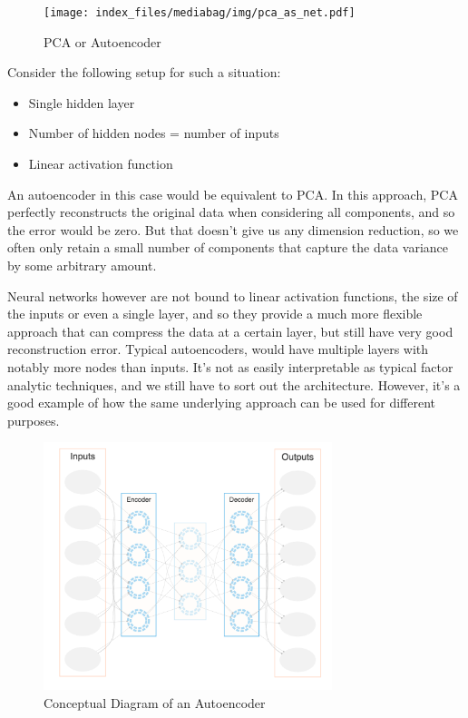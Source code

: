 \documentclass[
  letterpaper,
]{krantz}
\providecommand{\tightlist}{%
  \setlength{\itemsep}{0pt}\setlength{\parskip}{0pt}}\usepackage{longtable,booktabs,array}
\begin{document}
\begin{figure}

{\centering \texttt{[image: index\_files/mediabag/img/pca\_as\_net.pdf]}

}

\caption{PCA or Autoencoder}

\end{figure}

Consider the following setup for such a situation:

\begin{itemize}
\tightlist
\item
  Single hidden layer
\item
  Number of hidden nodes = number of inputs
\item
  Linear activation function
\end{itemize}

An autoencoder in this case would be equivalent to PCA. In this
approach, PCA perfectly reconstructs the original data when considering
all components, and so the error would be zero. But that doesn't give us
any dimension reduction, so we often only retain a small number of
components that capture the data variance by some arbitrary amount.

Neural networks however are not bound to linear activation functions,
the size of the inputs or even a single layer, and so they provide a
much more flexible approach that can compress the data at a certain
layer, but still have very good reconstruction error. Typical
autoencoders, would have multiple layers with notably more nodes than
inputs. It's not as easily interpretable as typical factor analytic
techniques, and we still have to sort out the architecture. However,
it's a good example of how the same underlying approach can be used for
different purposes.

\begin{figure}

{\centering \includegraphics[width=0.75\textwidth,height=\textheight]{img/autoencoder.png}

}

\caption{\label{fig-autoencoder}Conceptual Diagram of an Autoencoder}

\end{figure}
\end{document}
